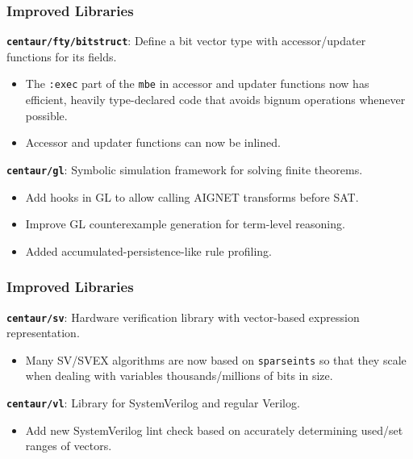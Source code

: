 \documentclass{beamer}
\newcommand{\code}[1]{\texttt{#1}}
\newcommand{\bookpath}[1]{\textbf{\code{#1}}}
\newcommand{\implibtitle}{\frametitle{Improved Libraries}}
\newcommand{\separation}{\vspace*{1ex}}
\begin{document}

\begin{frame}

\implibtitle

\bookpath{centaur/fty/bitstruct}:
Define a bit vector type with accessor/updater functions for its fields.
\begin{itemize}
\item
The \code{:exec} part of the \code{mbe} in accessor and updater
functions now has efficient, heavily type-declared code that avoids
bignum operations whenever possible.
\item
Accessor and updater functions can now be inlined.
\end{itemize}

\separation

\bookpath{centaur/gl}:
Symbolic simulation framework for solving finite theorems.
\begin{itemize}
\item
Add hooks in GL to allow calling AIGNET transforms before SAT.
\item
Improve GL counterexample generation for term-level reasoning.
\item
Added accumulated-persistence-like rule profiling.
\end{itemize}

\end{frame}


\begin{frame}

\implibtitle

\bookpath{centaur/sv}:
Hardware verification library with vector-based expression representation.
\begin{itemize}
\item
Many SV/SVEX algorithms are now based on \code{sparseints} so that they scale
when dealing with variables thousands/millions of bits in size.
\end{itemize}

\separation

\bookpath{centaur/vl}:
Library for SystemVerilog and regular Verilog.
\begin{itemize}
\item
Add new SystemVerilog lint check based on accurately determining
used/set ranges of vectors.
\end{itemize}

\end{frame}
\end{document}
